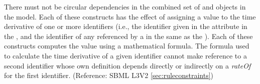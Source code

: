 There must not be circular dependencies in the combined set of \RateRule and \KineticLaw objects in the model.  Each of these constructs has the effect of assigning a value to the time derivative of one or more identifiers (i.e., the identifier given in the attribute  in the \RateRule, and the identifier of any \Species referenced by a \SpeciesReference in the same \Reaction as the \KineticLaw).  Each of these constructs computes the value using a mathematical formula.  The formula used to calculate the time derivative of a given identifier cannot make reference to a second identifier whose own definition depends directly or indirectly on a \emph{rateOf}  for the first identifier.  (Reference: SBML L3V2 \ref{sec:ruleconstraints})
